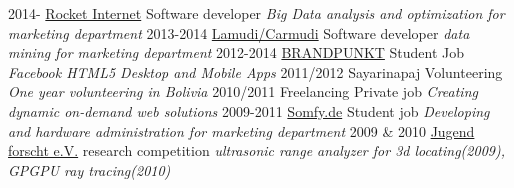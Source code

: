 \documentclass[]{friggeri-cv}
\begin{document}
\begin{entrylist}
  \entry
    {2014-}
    {\href{http://www.rocket-internet.com/}{Rocket Internet}}
    {Software developer}
    {\emph{Big Data analysis and optimization for marketing department}}
  \entry
    {2013-2014}
    {\href{http://www.lamudi.com/}{Lamudi/Carmudi}}
    {Software developer}
    {\emph{data mining for marketing department}}
  \entry
    {2012-2014}
    {\href{http://brandpunkt.com}{BRANDPUNKT}}
    {Student Job}
    {\emph{Facebook HTML5 Desktop and Mobile Apps}}
  \entry
    {2011/2012}
    {Sayarinapaj}
    {Volunteering}
    {\emph{One year volunteering in Bolivia}}
  \entry
    {2010/2011}
    {Freelancing}
    {Private job}
    {\emph{Creating dynamic on-demand web solutions}}
  \entry
    {2009-2011}
    {\href{http://www.somfy.de}{Somfy.de}}
    {Student job}
    {\emph{Developing and hardware administration for marketing department }}
  \entry
    {2009 \& 2010}
    {\href{http://jugend-forscht.de}{Jugend forscht e.V.}}
    {research competition}
    {\emph{ultrasonic range analyzer for 3d locating(2009), GPGPU ray tracing(2010)}}
\end{entrylist}

%

%
%
\end{document}

